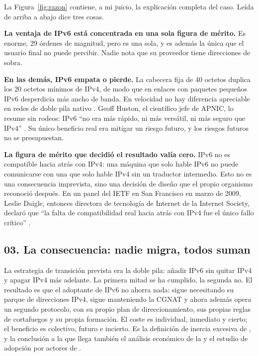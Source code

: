 \documentclass[11pt,letterpaper]{article}
\begin{document}
La Figura~\ref{fig:razon} contiene, a mi juicio, la explicación completa del
caso. Leída de arriba a abajo dice tres cosas.

\textbf{La ventaja de IPv6 está concentrada en una sola figura de mérito.} Es
enorme, 29 órdenes de magnitud, pero es una sola, y es además la única que el
usuario final no puede percibir. Nadie nota que su proveedor tiene direcciones de
sobra.

\textbf{En las demás, IPv6 empata o pierde.} La cabecera fija de 40 octetos
duplica los 20 octetos mínimos de IPv4, de modo que en enlaces con paquetes
pequeños IPv6 desperdicia más ancho de banda. En velocidad no hay diferencia
apreciable en redes de doble pila nativo \parencite{howard2019}. Geoff Huston, el
científico jefe de APNIC, lo resume sin rodeos: IPv6 \enquote{no era más rápido,
ni más versátil, ni más seguro que IPv4} \parencite{huston2024}. Su único
beneficio real era mitigar un riesgo futuro, y los riesgos futuros no se
presupuestan.

\textbf{La figura de mérito que decidió el resultado valía cero.} IPv6 no es
compatible hacia atrás con IPv4: una máquina que solo hable IPv6 no puede
comunicarse con una que solo hable IPv4 sin un traductor intermedio. Esto no es
una consecuencia imprevista, sino una decisión de diseño que el propio organismo
reconoció después. En un panel del IETF en San Francisco en marzo de 2009, Leslie
Daigle, entonces directora de tecnología de Internet de la Internet Society,
declaró que \enquote{la falta de compatibilidad real hacia atrás con IPv4 fue el
único fallo crítico} \parencite{daigle2009}.

\subsection*{03. La consecuencia: nadie migra, todos suman}

La estrategia de transición prevista era la doble pila: añadir IPv6 sin quitar
IPv4 y apagar IPv4 más adelante. La primera mitad se ha cumplido, la segunda no.
El resultado es que el adoptante de IPv6 no ahorra nada: sigue necesitando su
parque de direcciones IPv4, sigue manteniendo la CGNAT y ahora además opera un
segundo protocolo, con su propio plan de direccionamiento, sus propias reglas de
cortafuegos y su propia formación. El coste es individual, inmediato y cierto; el
beneficio es colectivo, futuro e incierto. Es la definición de inercia excesiva
de \textcite{farrell1985}, y la conclusión a la que llega también el análisis
económico de la \textcite{oecd2014} y el estudio de adopción por actores de
\textcite{nikkhah2016}.
\end{document}
